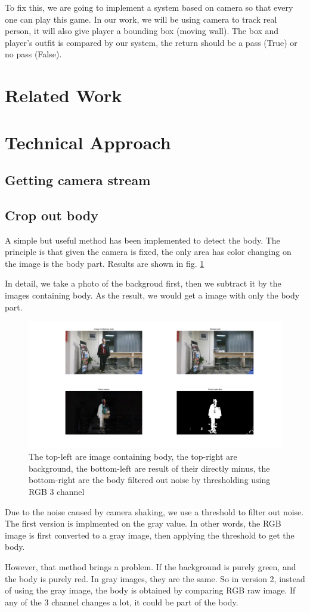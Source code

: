 \documentclass[conference,compsoc]{IEEEtran}
\begin{document}
	\par
		To fix this, we are going to implement a system based on camera so that every one can play this game.
		In our work, we will be using camera to track real person, it will also give player a bounding box (moving wall).
		The box and player's outfit is compared by our system, the return should be a pass (True) or no pass (False).
\section{Related Work}
\section{Technical Approach}
\subsection{Getting camera stream}
\subsection{Crop out body}
\par
A simple but useful method has been implemented to detect the body. The principle is that given the camera is fixed, the only area has color changing on the image is the body part. Results are shown in fig. \ref{CropBody}
\par
In detail, we take a photo of the backgroud first, then we subtract it by the images containing body. As the result, we would get a image with only the body part.
\begin{figure}[h]
	\centering
	\includegraphics[width=\linewidth]{./Pic/CropBody}
	\caption{The top-left are image containing body, the top-right are background, the bottom-left are result of their directly minus, the bottom-right are the body filtered out noise by thresholding using RGB 3 channel}
	\label{CropBody}
\end{figure}
\par
Due to the noise caused by camera shaking, we use a threshold to filter out noise. The first version is implmented on the gray value. In other words, the RGB image is first converted to a gray image, then applying the threshold to get the body.
\par
However, that method brings a problem. If the background is purely green, and the body is purely red. In gray images, they are the same. So in version 2, instead of using the gray image, the body is obtained by comparing RGB raw image. If any of the 3 channel changes a lot, it could be part of the body.
\end{document}
